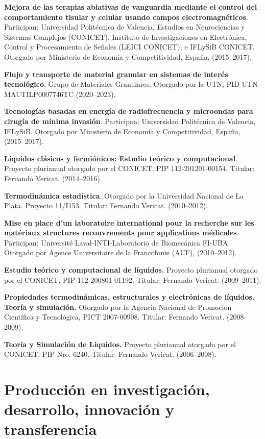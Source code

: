 \documentclass[margin,line]{res}
\begin{document}
\begin{resume}
\textbf{Mejora de las terapias ablativas de vanguardia mediante el control del comportamiento tisular y celular usando campos electromagnéticos}. Participan: Universidad Politécnica de Valencia, Estudios en Neurociencias y Sistemas Complejos (CONICET), Instituto de Investigaciones en Electrónica, Control y Procesamiento de Señales (LEICI CONICET), e IFLySiB CONICET. Otorgado por Ministerio de Economía y Competitividad, España, (2015--2017).

\textbf{Flujo y transporte de material granular en sistemas de interés tecnológico}. Grupo de Materiales Granulares. Otorgado por la UTN, PID UTN MAUTILP0007746TC (2020--2023).

\textbf{Tecnologías basadas en energía de radiofrecuencia y microondas para cirugía de mínima invasión}. Participan: Universidad Politécnica de Valencia, IFLySiB. Otorgado por Ministerio de Economía y Competitividad, España, (2015--2017).

\textbf{Líquidos clásicos y fermiónicos: Estudio teórico y computacional}. Proyecto plurianual otorgado por el CONICET, PIP 112-201201-00154. Titular: Fernando Vericat. (2014--2016).

\textbf{Termodinámica estadística}. Otorgado por la Universidad Nacional de La Plata. Proyecto 11/I153. Titular: Fernando Vericat. (2010--2012). 

\textbf{Mise en place d’un laboratoire international pour la recherche sur les matériaux structures recouvrements pour applications médicales}. Participan: Université Laval-INTI-Laboratorio de Biomecánica FI-UBA. Otorgado por Agence Universitaire de la Francofonie (AUF), (2010--2012).

\textbf{Estudio teórico y computacional de líquidos.} Proyecto plurianual otorgado por el CONICET, PIP  112-200801-01192. Titular: Fernando Vericat. (2009--2011).

\textbf{Propiedades termodinámicas, estructurales y electrónicas de líquidos. Teoría y simulación.} Otorgado por la Agencia Nacional de Promoción Científica y Tecnológica, PICT 2007-00908. Titular: Fernando Vericat. (2008--2009).

\textbf{Teoría y Simulación de Líquidos.} Proyecto plurianual otorgado por el CONICET, PIP Nro. 6240. Titular: Fernando Vericat. (2006--2008).

\bigskip

\section{ Producción en investigación, desarrollo, innovación y transferencia}
\vspace*{-.2in}


\end{resume}
\end{document}
